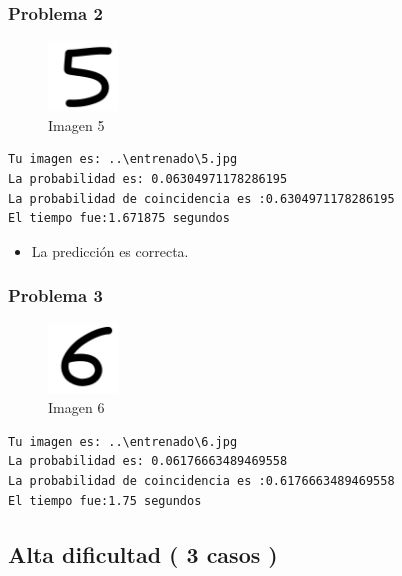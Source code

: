 \documentclass[
  spanish,
]{article}
\providecommand{\tightlist}{%
  \setlength{\itemsep}{0pt}\setlength{\parskip}{0pt}}
\begin{document}
\hypertarget{problema-2-1}{%
\subsubsection{Problema 2}\label{problema-2-1}}

\begin{figure}
\centering
\includegraphics[width=0.72917in,height=\textheight]{documentacion/img/5.png}
\caption{Imagen 5}
\end{figure}

\begin{verbatim}
Tu imagen es: ..\entrenado\5.jpg
La probabilidad es: 0.06304971178286195
La probabilidad de coincidencia es :0.6304971178286195
El tiempo fue:1.671875 segundos
\end{verbatim}

\begin{itemize}
\tightlist
\item
  La predicción es correcta.
\end{itemize}

\hypertarget{problema-3-1}{%
\subsubsection{Problema 3}\label{problema-3-1}}

\begin{figure}
\centering
\includegraphics[width=0.72917in,height=\textheight]{documentacion/img/6.png}
\caption{Imagen 6}
\end{figure}

\begin{verbatim}
Tu imagen es: ..\entrenado\6.jpg
La probabilidad es: 0.06176663489469558
La probabilidad de coincidencia es :0.6176663489469558
El tiempo fue:1.75 segundos
\end{verbatim}

\hypertarget{alta-dificultad-3-casos}{%
\subsection{Alta dificultad ( 3 casos )}\label{alta-dificultad-3-casos}}
\end{document}
